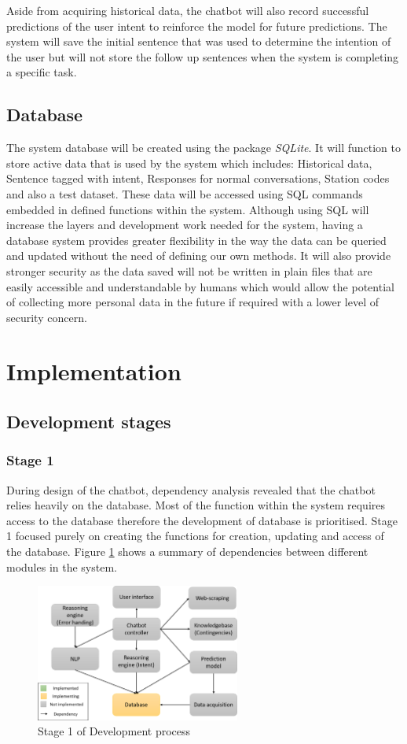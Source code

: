 \documentclass[11pt]{article}
\begin{document}
Aside from acquiring historical data, the chatbot will also record successful predictions of the user intent to reinforce the model for future predictions. The system will save the initial sentence that was used to determine the intention of the user but will not store the follow up sentences when the system is completing a specific task.

\subsection{Database}
The system database will be created using the package \textit{SQLite}. It will function to store active data that is used by the system which includes: Historical data, Sentence tagged with intent, Responses for normal conversations, Station codes and also a test dataset. These data will be accessed using SQL commands embedded in defined functions within the system. Although using SQL will increase the layers and development work needed for the system, having a database system provides greater flexibility in the way the data can be queried and updated without the need of defining our own methods. It will also provide stronger security as the data saved will not be written in plain files that are easily accessible and understandable by humans which would allow the potential of collecting more personal data in the future if required with a lower level of security concern.

\section{Implementation}
\subsection{Development stages} \label{Dev. stages}
\subsubsection{Stage 1}
During design of the chatbot, dependency analysis revealed that the chatbot relies heavily on the database. Most of the function within the system requires access to the database therefore the development of database is prioritised. Stage 1 focused purely on creating the functions for creation, updating and access of the database. Figure \ref{fig:Stage 1} shows a summary of dependencies between different modules in the system.
\begin{figure}[!htb]
	\centering
	\includegraphics[width=0.6\textwidth]{Stage_1}
	\caption{Stage 1 of Development process }\label{fig:Stage 1}
\end{figure}
\end{document}
